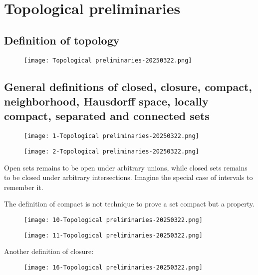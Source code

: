 \section{Topological preliminaries}

\subsection{Definition of topology}

\begin{figure}[H]
\centering
\texttt{[image: Topological preliminaries-20250322.png]}
\label{}
\end{figure}

\subsection{General definitions of closed, closure, compact, neighborhood, Hausdorff space, locally compact, separated and connected sets}

\begin{figure}[H]
\centering
\texttt{[image: 1-Topological preliminaries-20250322.png]}
\label{}
\end{figure}
\begin{figure}[H]
\centering
\texttt{[image: 2-Topological preliminaries-20250322.png]}
\label{}
\end{figure}
Open sets remains to be open under arbitrary unions, while closed sets remains to be closed under arbitrary intersections. Imagine the special case of intervals to remember it.

The definition of compact is not technique to prove a set compact but a property.

\begin{figure}[H]
\centering
\texttt{[image: 10-Topological preliminaries-20250322.png]}
\label{}
\end{figure}
\begin{figure}[H]
\centering
\texttt{[image: 11-Topological preliminaries-20250322.png]}
\label{}
\end{figure}

Another definition of closure:
\begin{figure}[H]
\centering
\texttt{[image: 16-Topological preliminaries-20250322.png]}
\label{}
\end{figure}

